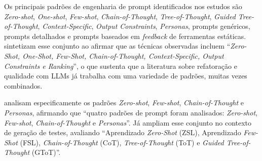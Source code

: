 


Os principais padrões de engenharia de prompt identificados nos estudos são \textit{Zero-shot}, \textit{One-shot}, \textit{Few-shot}, \textit{Chain-of-Thought}, \textit{Tree-of-Thought}, \textit{Guided Tree-of-Thought}, \textit{Context-Specific}, \textit{Output Constraints}, \textit{Personas}, prompts genéricos, prompts detalhados e prompts baseados em \textit{feedback} de ferramentas estáticas.  sintetizam esse conjunto ao afirmar que as técnicas observadas incluem ``\textit{Zero-Shot, One-Shot, Few-Shot, Chain-of-Thought, Context-Specific, Output Constraints e Ranking}'', o que sustenta que a literatura sobre refatoração e qualidade com LLMs já trabalha com uma variedade de padrões, muitas vezes combinados.

 analisam especificamente os padrões \textit{Zero-shot}, \textit{Few-shot}, \textit{Chain-of-Thought} e \textit{Personas}, afirmando que ``quatro padrões de prompt foram analisados: \textit{Zero-shot}, \textit{Few-shot}, \textit{Chain-of-Thought} e \textit{Personas}''. Já  ampliam esse conjunto no contexto de geração de testes, avaliando ``Aprendizado \textit{Zero-Shot} (ZSL), Aprendizado \textit{Few-Shot} (FSL), \textit{Chain-of-Thought} (CoT), \textit{Tree-of-Thought} (ToT) e \textit{Guided Tree-of-Thought} (GToT)''.

